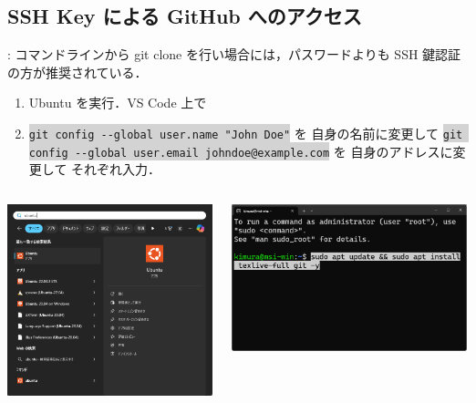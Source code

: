 \documentclass[aspectratio=169,dvipdfmx,cjk]{beamer}
\newcommand{\cmdline}[1]{
    \colorbox{lightgray}{\lstinline[style=command]{#1}}
}
\newcommand{\blue}[1]{ {\color{blue} #1} }
\begin{document}
\subsection*{SSH Key による GitHub へのアクセス}
\begin{frame}{\insertsection \thesubsection: \insertsubsection}
  コマンドラインから git clone を行い場合には，パスワードよりも SSH 鍵認証の方が推奨されている．
  \begin{enumerate}
    \item Ubuntu を実行．VS Code 上で
    \item \cmdline{git config --global user.name "John Doe"} を\blue{自身の名前に変更して} \cmdline{git config --global user.email johndoe@example.com} を\blue{自身のアドレスに変更して}それぞれ入力\cite{GitBook}．
  \end{enumerate}
  \begin{columns}
    \begin{column}{0.2\textwidth}
        \includegraphics[width=1.0\linewidth]{fig/start-ubuntu.png}
    \end{column}
    \begin{column}{0.3\textwidth}
      \includegraphics[width=1.0\linewidth]{fig/texlive.png}

\end{column}
\end{columns}
\end{frame}
\end{document}
